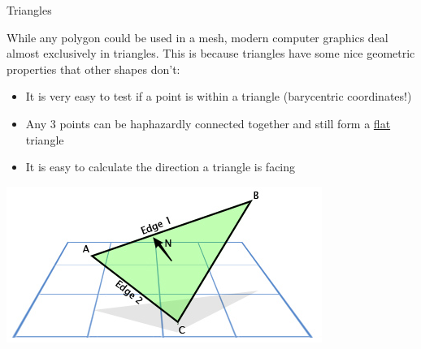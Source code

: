 \documentclass{lug}
\newcommand{\splitslide}[4]{
    \noindent
    \begin{minipage}{#1 \textwidth - #2 }
        #3
    \end{minipage}%
    \hspace{ \dimexpr #2 * 2 \relax }%
    \begin{minipage}{\textwidth - #1 \textwidth - #2 }
        #4
    \end{minipage}
}
\begin{document}
\begin{frame}{Triangles}
    \splitslide{0.65}{.7em}{
        \small

        While any polygon could be used in a mesh, modern computer graphics
        deal almost exclusively in triangles. This is because triangles have
        some nice geometric properties that other shapes don't:

        \begin{itemize}
            \item It is very easy to test if a point is within a triangle (barycentric coordinates!)
            \item Any 3 points can be haphazardly connected together and still form a \underline{flat} triangle
            \item It is easy to calculate the direction a triangle is facing
        \end{itemize}
    }{
        \includegraphics[width=\textwidth]{graphics/triangle}
    }
\end{frame}
\end{document}
